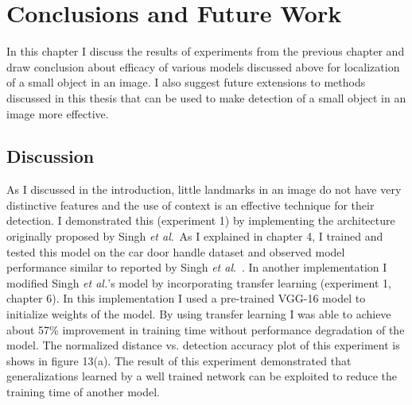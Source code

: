 \documentclass [11pt,letterpaper ,twoside ,openany ]{report}
\begin{document}
    \chapter{Conclusions and Future Work}
    \doublespacing

    In this chapter I discuss the results of experiments from the previous chapter and draw conclusion about efficacy of various models discussed above for localization of a small object in an image. I also suggest future extensions to methods discussed in this thesis that can be used to make detection of a small object in an image more effective.

    \section{Discussion}

    As I discussed in the introduction, little landmarks in an image do not have very distinctive features and the use of context is an effective technique for their detection. I demonstrated this (experiment 1) by implementing the architecture originally proposed by Singh \textit{et al}.\ As I explained in chapter 4, I trained and tested this model on the car door handle dataset and observed model performance similar to reported by Singh \textit{et al}.\ \cite{Singh_2016_CVPR}. In another implementation I modified Singh \textit{et al.}'s model \cite{Singh_2016_CVPR} by incorporating transfer learning (experiment 1, chapter 6). In this implementation I used a pre-trained VGG-16 model \cite{simonyan2014very} to initialize weights of the model. By using transfer learning I was able to achieve about 57\% improvement in training time without performance degradation of the model. The normalized distance vs. detection accuracy plot of this experiment is shows in figure 13(a). The result of this experiment demonstrated that generalizations learned by a well trained network can be exploited to reduce the training time of another model.
\end{document}
